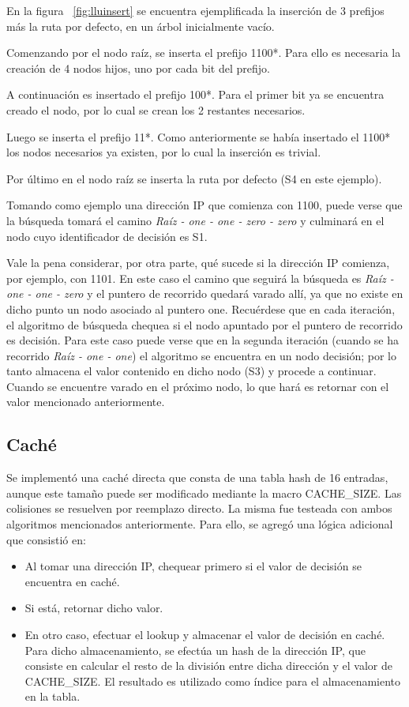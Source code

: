 En la figura ~\ref{fig:lluinsert} se encuentra ejemplificada la inserción de 3 prefijos más la ruta por defecto, en un árbol inicialmente vacío. 

Comenzando por el nodo raíz, se inserta el prefijo 1100*. Para ello es necesaria la creación de 4 nodos hijos, uno por cada bit del prefijo. 

A continuación es insertado el prefijo 100*. Para el primer bit ya se encuentra creado el nodo, por lo cual se crean los 2 restantes necesarios.

Luego se inserta el prefijo 11*. Como anteriormente se había insertado el 1100* los nodos necesarios ya existen, por lo cual la inserción es trivial.

Por último en el nodo raíz se inserta la ruta por defecto (S4 en este ejemplo).

Tomando como ejemplo una dirección IP que comienza con 1100, puede verse que la búsqueda tomará el camino \textit{Raíz - one - one - zero - zero} y culminará en el nodo cuyo identificador de decisión es S1. 

Vale la pena considerar, por otra parte, qué sucede si la dirección IP comienza, por ejemplo, con 1101. En este caso el camino que seguirá la búsqueda es \textit{Raíz - one - one - zero} y el puntero de recorrido quedará varado allí, ya que no existe en dicho punto un nodo asociado al puntero one. Recuérdese que en cada iteración, el algoritmo de búsqueda chequea si el nodo apuntado por el puntero de recorrido es decisión. Para este caso puede verse que en la segunda iteración (cuando se ha recorrido \textit{Raíz - one - one}) el algoritmo se encuentra en un nodo decisión; por lo tanto almacena el valor contenido en dicho nodo (S3) y procede a continuar. Cuando se encuentre varado en el próximo nodo, lo que hará es retornar con el valor mencionado anteriormente. 

\subsection {Caché}

Se implementó una caché directa que consta de una tabla hash de 16 entradas, aunque este tamaño puede ser modificado mediante la macro CACHE\_SIZE. Las colisiones se resuelven por reemplazo directo. La misma fue testeada con ambos algoritmos mencionados anteriormente. Para ello, se agregó una lógica adicional que consistió en:

\begin{itemize}
	\item Al tomar una dirección IP, chequear primero si el valor de decisión se encuentra en caché.
	\item Si está, retornar dicho valor.
	\item En otro caso, efectuar el lookup y almacenar el valor de decisión en caché. Para dicho almacenamiento, se efectúa un hash de la dirección IP, que consiste en calcular el resto de la división entre dicha dirección y el valor de CACHE\_SIZE. El resultado es utilizado como índice para el almacenamiento en la tabla.
\end{itemize}

